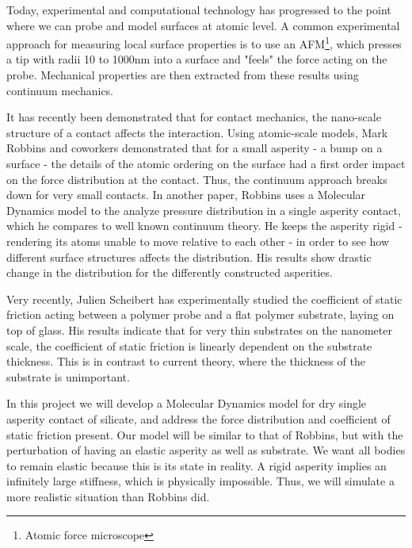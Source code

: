 \documentclass[twoside,english]{uiofysmaster}
\begin{document}
Today, experimental and computational technology has progressed to the point where we can probe and model surfaces at atomic level.
A common experimental approach for measuring local surface properties is to use an AFM\footnote{Atomic force microscope},
which presses a tip with radii 10 to 1000nm into a surface and "feels" the force acting on the probe. 
Mechanical properties are then extracted from these results using continuum mechanics.

It has recently been demonstrated that for contact mechanics, the nano-scale
structure of a contact affects the interaction. 
Using atomic-scale models, Mark Robbins and coworkers \cite{Robbins2005} demonstrated that for a small asperity - a bump on a surface - the details of the atomic ordering on the surface had a first order impact on the force distribution at the contact. 
Thus, the continuum approach breaks down for very small contacts.
In another paper, Robbins \cite{RobbinsSingleAsperity} uses a Molecular Dynamics model to the analyze pressure distribution in a single asperity contact, which he compares to well known continuum theory. He keeps the asperity rigid - rendering its atoms unable to move relative to each other - in order to see how different surface structures affects the distribution. His results show drastic change in the distribution for the differently constructed asperities.   


Very recently, Julien Scheibert \cite{Scheibert2017} has experimentally studied the coefficient of static friction  acting between a polymer probe and a flat polymer substrate, laying on top of glass. 
His results indicate that for very thin substrates on the nanometer scale, the coefficient of static friction is linearly dependent on the substrate thickness. 
This is in contrast to current theory, where the thickness of the substrate is unimportant. 

In this project we will develop a Molecular Dynamics model for dry single asperity contact of silicate, and address the force distribution and coefficient of static friction present.
Our model will be similar to that of Robbins, but with the perturbation of having an elastic asperity as well as substrate.
We want all bodies to remain elastic because this is its state in reality. 
A rigid asperity implies an infinitely large stiffness, which is physically impossible. 
Thus, we will simulate a more realistic situation than Robbins did.
\end{document}
